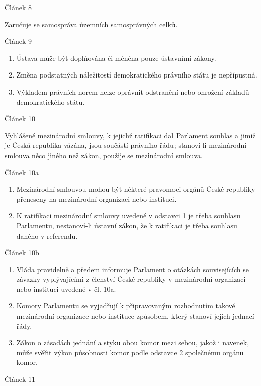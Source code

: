 \documentclass[10pt,a4paper,
twoside,%
]{report}
\begin{document}
 \begin{center}
Článek 8
\end{center}
Zaručuje se samospráva územních samosprávných celků.
 \begin{center}
Článek 9
\end{center}
\begin{enumerate} \item Ústava může být doplňována či měněna pouze ústavními zákony.
\item Změna podstatných náležitostí demokratického právního státu je nepřípustná.
\item Výkladem právních norem nelze oprávnit odstranění nebo ohrožení základů demokratického státu.
\end{enumerate} \begin{center}
Článek 10
\end{center}
Vyhlášené mezinárodní smlouvy, k jejichž ratifikaci dal Parlament souhlas a jimiž je Česká republika vázána, jsou součástí právního řádu; stanoví-li mezinárodní
smlouva něco jiného než zákon, použije se mezinárodní smlouva.
 \begin{center}
Článek 10a
\end{center}
\begin{enumerate} \item Mezinárodní smlouvou mohou být některé pravomoci orgánů České republiky přeneseny na mezinárodní organizaci nebo instituci.
\item K ratifikaci mezinárodní smlouvy uvedené v odstavci 1 je třeba souhlasu Parlamentu, nestanoví-li ústavní zákon, že k ratifikaci je třeba souhlasu daného v
referendu.
\end{enumerate} \begin{center}
Článek 10b
\end{center}
\begin{enumerate} \item Vláda pravidelně a předem informuje Parlament o otázkách souvisejících se závazky vyplývajícími z členství České republiky v mezinárodní organizaci nebo
instituci uvedené v čl. 10a.
\item Komory Parlamentu se vyjadřují k připravovaným rozhodnutím takové mezinárodní organizace nebo instituce způsobem, který stanoví jejich jednací řády.
\item Zákon o zásadách jednání a styku obou komor mezi sebou, jakož i navenek, může svěřit výkon působnosti komor podle odstavce 2 společnému orgánu komor.
\end{enumerate} \begin{center}
Článek 11
\end{center}
\end{document}
